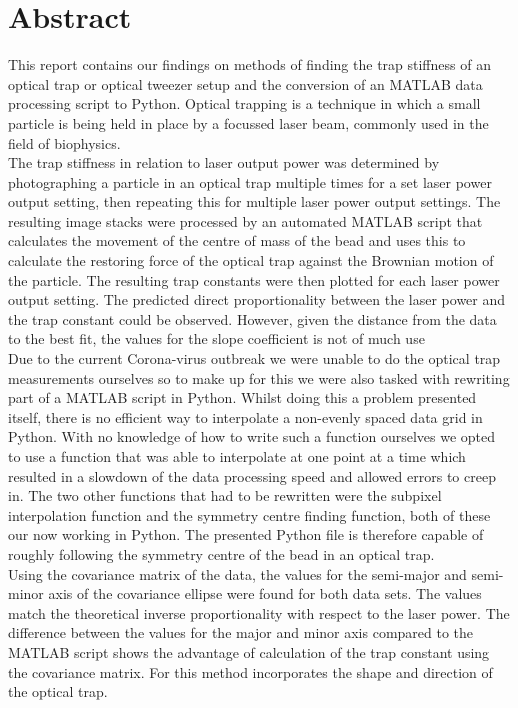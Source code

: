 \section{Abstract}
This report contains our findings on methods of finding the trap stiffness of an optical trap or optical tweezer setup and the conversion of an MATLAB data processing script to Python. Optical trapping is a technique in which a small particle is being held in place by a focussed laser beam, commonly used in the field of biophysics.\\
The trap stiffness in relation to laser output power was determined by photographing a particle in an optical trap multiple times for a set laser power output setting, then repeating this for multiple laser power output settings. The resulting image stacks were processed by an automated MATLAB script that calculates the movement of the centre of mass of the bead and uses this to calculate the restoring force of the optical trap against the Brownian motion of the particle. The resulting trap constants were then plotted for each laser power output setting. The predicted direct proportionality between the laser power and the trap constant could be observed. However, given the distance from the data to the best fit, the values for the slope coefficient is not of much use\\
Due to the current Corona-virus outbreak we were unable to do the optical trap measurements ourselves so to make up for this we were also tasked with rewriting part of a MATLAB script in Python. Whilst doing this a problem presented itself, there is no efficient way to interpolate a non-evenly spaced data grid in Python. With no knowledge of how to write such a function ourselves we opted to use a function that was able to interpolate at one point at a time which resulted in a slowdown of the data processing speed and allowed errors to creep in. The two other functions that had to be rewritten were the subpixel interpolation function and the symmetry centre finding function, both of these our now working in Python. The presented Python file is therefore capable of roughly following the symmetry centre of the bead in an optical trap.\\
Using the covariance matrix of the data, the values for the semi-major and semi-minor axis of the covariance ellipse were found for both data sets. The values match the theoretical inverse proportionality with respect to the laser power. The difference between the values for the major and minor axis compared to the MATLAB script shows the advantage of calculation of the trap constant using the covariance matrix. For this method incorporates the shape and direction of the optical trap.
